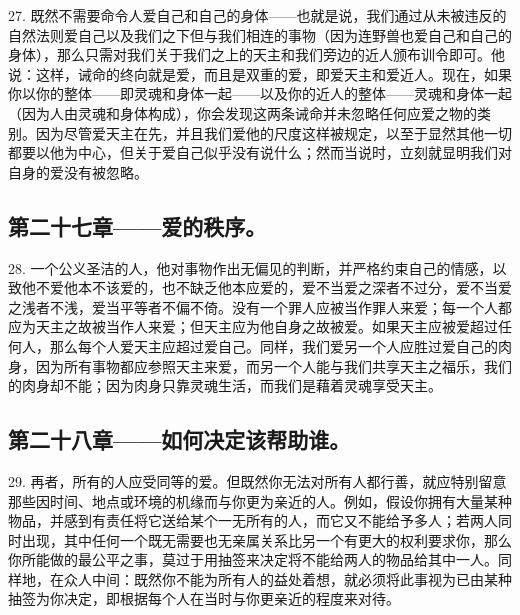 27. 既然不需要命令人爱自己和自己的身体——也就是说，我们通过从未被违反的自然法则爱自己以及我们之下但与我们相连的事物（因为连野兽也爱自己和自己的身体），那么只需对我们关于我们之上的天主和我们旁边的近人颁布训令即可。他说：这样，诫命的终向就是爱，而且是双重的爱，即爱天主和爱近人。现在，如果你以你的整体——即灵魂和身体一起——以及你的近人的整体——灵魂和身体一起（因为人由灵魂和身体构成），你会发现这两条诫命并未忽略任何应爱之物的类别。因为尽管爱天主在先，并且我们爱他的尺度这样被规定，以至于显然其他一切都要以他为中心，但关于爱自己似乎没有说什么；然而当说时，立刻就显明我们对自身的爱没有被忽略。\par


\subsection{第二十七章——爱的秩序。}

28. 一个公义圣洁的人，他对事物作出无偏见的判断，并严格约束自己的情感，以致他不爱他本不该爱的，也不缺乏他本应爱的，爱不当爱之深者不过分，爱不当爱之浅者不浅，爱当平等者不偏不倚。没有一个罪人应被当作罪人来爱；每一个人都应为天主之故被当作人来爱；但天主应为他自身之故被爱。如果天主应被爱超过任何人，那么每个人爱天主应超过爱自己。同样，我们爱另一个人应胜过爱自己的肉身，因为所有事物都应参照天主来爱，而另一个人能与我们共享天主之福乐，我们的肉身却不能；因为肉身只靠灵魂生活，而我们是藉着灵魂享受天主。\par


\subsection{第二十八章——如何决定该帮助谁。}

29. 再者，所有的人应受同等的爱。但既然你无法对所有人都行善，就应特别留意那些因时间、地点或环境的机缘而与你更为亲近的人。例如，假设你拥有大量某种物品，并感到有责任将它送给某个一无所有的人，而它又不能给予多人；若两人同时出现，其中任何一个既无需要也无亲属关系比另一个有更大的权利要求你，那么你所能做的最公平之事，莫过于用抽签来决定将不能给两人的物品给其中一人。同样地，在众人中间：既然你不能为所有人的益处着想，就必须将此事视为已由某种抽签为你决定，即根据每个人在当时与你更亲近的程度来对待。\par

